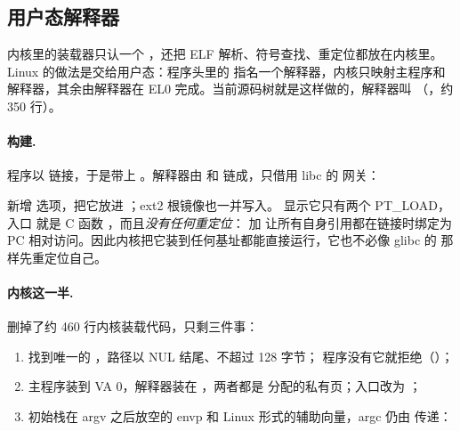 \subsection{用户态解释器 }
\label{sec:ldxv6}

内核里的装载器只认一个 ，还把 ELF 解析、符号查找、重定位都放在内核里。Linux 的做法是交给用户态：程序头里的  指名一个解释器，内核只映射主程序和解释器，其余由解释器在 EL0 完成。当前源码树就是这样做的，解释器叫 （，约 350 行）。

\paragraph{构建.} 程序以  链接，于是带上 。解释器由  和  链成，只借用 libc 的  网关：


 新增  选项，把它放进 ；ext2 根镜像也一并写入。 显示它只有两个 PT\_LOAD，入口  就是 C 函数 ，而且\emph{没有任何重定位}： 加  让所有自身引用都在链接时绑定为 PC 相对访问。因此内核把它装到任何基址都能直接运行，它也不必像 glibc 的  那样先重定位自己。

\paragraph{内核这一半.}  删掉了约 460 行内核装载代码，只剩三件事：

\begin{enumerate}
  \item {} 找到唯一的 ，路径以 NUL 结尾、不超过 128 字节； 程序没有它就拒绝（）；
  \item 主程序装到 VA 0，解释器装在 ，两者都是  分配的私有页；入口改为 ；
  \item 初始栈在 argv 之后放空的 envp 和 Linux 形式的辅助向量，argc 仍由  传递：
\end{enumerate}

